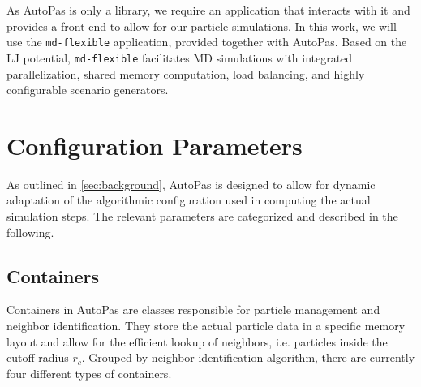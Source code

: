 
As AutoPas is only a library, we require an application that interacts with it and provides a front end to allow for our particle simulations. In this work, we will use the \texttt{md-flexible} application, provided together with AutoPas. Based on the LJ potential, \texttt{md-flexible} facilitates MD simulations with integrated parallelization, shared memory computation, load balancing, and highly configurable scenario generators.


\section{Configuration Parameters}
\label{sec:config_params}

As outlined in \autoref{sec:background}, AutoPas is designed to allow for dynamic adaptation of the algorithmic configuration used in computing the actual simulation steps. The relevant parameters are categorized and described in the following.

\subsection{Containers}

Containers in AutoPas are classes responsible for particle management and neighbor identification. They store the actual particle data in a specific memory layout and allow for the efficient lookup of neighbors, i.e. particles inside the cutoff radius $r_c$. Grouped by neighbor identification algorithm, there are currently four different types of containers.

